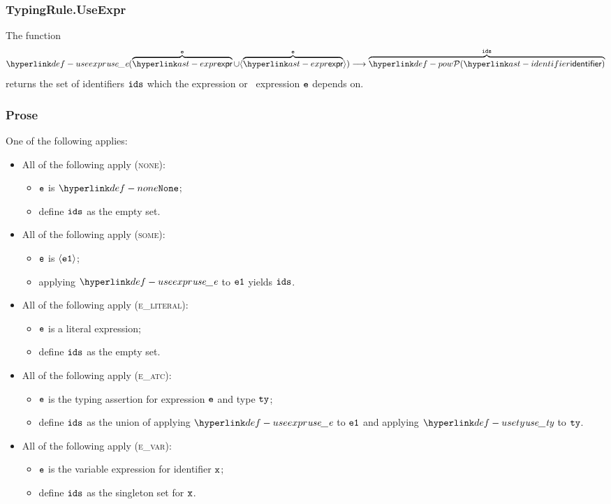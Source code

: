 \subsubsection{TypingRule.UseExpr \label{sec:TypingRule.UseExpr}}
\hypertarget{def-useexpr}{}
The function
\[
\useexpr(\overname{\expr}{\ve} \cup \langle\overname{\expr}{\ve}\rangle) \aslto \overname{\pow{\identifier}}{\ids}
\]
returns the set of identifiers $\texttt{ids}$ which the expression or \optional\ expression $\texttt{e}$ depends on.

\subsubsection{Prose}
One of the following applies:
\begin{itemize}
  \item All of the following apply (\textsc{none}):
  \begin{itemize}
    \item $\texttt{e}$ is $\None$;
    \item define $\texttt{ids}$ as the empty set.
  \end{itemize}

  \item All of the following apply (\textsc{some}):
  \begin{itemize}
    \item $\texttt{e}$ is $\langle\texttt{e1}\rangle$;
    \item applying $\useexpr$ to $\texttt{e1}$ yields $\texttt{ids}$.
  \end{itemize}

  \item All of the following apply (\textsc{e\_literal}):
  \begin{itemize}
    \item $\texttt{e}$ is a literal expression;
    \item define $\texttt{ids}$ as the empty set.
  \end{itemize}

  \item All of the following apply (\textsc{e\_atc}):
  \begin{itemize}
    \item $\texttt{e}$ is the typing assertion for expression $\texttt{e}$ and type $\texttt{ty}$;
    \item define $\texttt{ids}$ as the union of applying $\useexpr$ to $\texttt{e1}$ and applying $\usety$ to $\texttt{ty}$.
  \end{itemize}

  \item All of the following apply (\textsc{e\_var}):
  \begin{itemize}
    \item $\texttt{e}$ is the variable expression for identifier $\texttt{x}$;
    \item define $\texttt{ids}$ as the singleton set for $\texttt{x}$.
  \end{itemize}


\end{itemize}
